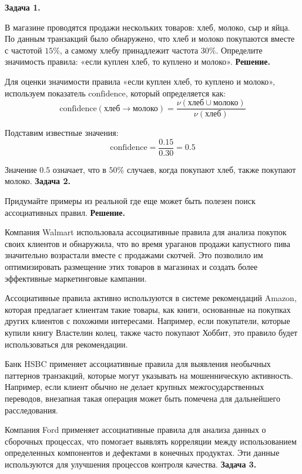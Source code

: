 \textbf{Задача 1.}

В магазине проводятся продажи нескольких товаров: хлеб, молоко, сыр и яйца. По данным транзакций было обнаружено, что хлеб и молоко покупаются вместе с частотой $15\%$, а самому хлебу принадлежит частота $30\%$. Определите значимость правила: «если куплен хлеб, то куплено и молоко».
\newline
\textbf{Решение.}

Для оценки значимости правила «если куплен хлеб, то куплено и молоко», используем показатель \(\text{confidence}\), который определяется как:
\[
    \text{confidence}(\text{хлеб} \rightarrow \text{молоко}) = \frac{\nu(\text{хлеб} \cup \text{молоко})}{\nu(\text{хлеб})}
\]

Подставим известные значения:
\[
    \text{confidence} = \frac{0.15}{0.30} = 0.5
\]

Значение $0.5$ означает, что в $50\%$ случаев, когда покупают хлеб, также покупают молоко.
\newline
\textbf{Задача 2.}

Придумайте примеры из реальной где еще может быть полезен поиск ассоциативных правил.
\newline
\textbf{Решение.}

Компания Walmart использовала ассоциативные правила для анализа покупок своих клиентов и обнаружила, что во время ураганов продажи капустного пива значительно возрастали вместе с продажами скотчей. Это позволило им оптимизировать размещение этих товаров в магазинах и создать более эффективные маркетинговые кампании.

Ассоциативные правила активно используются в системе рекомендаций Amazon, которая предлагает клиентам такие товары, как книги, основанные на покупках других клиентов с похожими интересами. Например, если покупатели, которые купили книгу Властелин колец, также часто покупают Хоббит, это правило будет использоваться для рекомендации.

Банк HSBC применяет ассоциативные правила для выявления необычных паттернов транзакций, которые могут указывать на мошенническую активность. Например, если клиент обычно не делает крупных межгосударственных переводов, внезапная такая операция может быть помечена для дальнейшего расследования.

Компания Ford применяет ассоциативные правила для анализа данных о сборочных процессах, что помогает выявлять корреляции между использованием определенных компонентов и дефектами в конечных продуктах. Эти данные используются для улучшения процессов контроля качества.
\newline
\textbf{Задача 3.}

